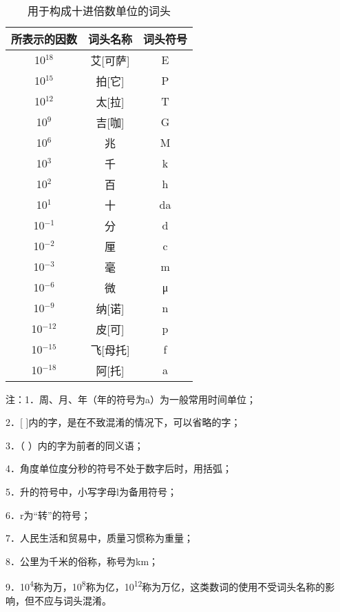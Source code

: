 \hspace*{\fill} \\


\begin{table}[htbp]
    \centering
    \caption{用于构成十进倍数单位的词头}
    \begin{tabular}{ccc}
        \toprule
        所表示的因数 & 词头名称 & 词头符号 \\
        \midrule
        10$^{18}$    & 艾[可萨] & E        \\
        10$^{15}$    & 拍[它]   & P        \\
        10$^{12}$    & 太[拉]   & T        \\
        10$^{9}$     & 吉[咖]   & G        \\
        10$^{6}$     & 兆       & M        \\
        10$^{3}$     & 千       & k        \\
        10$^{2}$     & 百       & h        \\
        10$^{1}$     & 十       & da       \\
        10$^{-1}$    & 分       & d        \\
        10$^{-2}$    & 厘       & c        \\
        10$^{-3}$    & 毫       & m        \\
        10$^{-6}$    & 微       & μ        \\
        10$^{-9}$    & 纳[诺]   & n        \\
        10$^{-12}$   & 皮[可]   & p        \\
        10$^{-15}$   & 飞[母托] & f        \\
        10$^{-18}$   & 阿[托]   & a        \\
        \bottomrule
    \end{tabular}%
    \label{tab:addlabel}%
\end{table}%

\parbox[t]{\textwidth}{
注：1．周、月、年（年的符号为a）为一般常用时间单位；

\hspace{2em}2．{[} {]}内的字，是在不致混淆的情况下，可以省略的字；

\hspace{2em}3．（ ）内的字为前者的同义语；

\hspace{2em}4．角度单位度分秒的符号不处于数字后时，用括弧；

\hspace{2em}5．升的符号中，小写字母l为备用符号；

\hspace{2em}6．r为``转''的符号；

\hspace{2em}7．人民生活和贸易中，质量习惯称为重量；

\hspace{2em}8．公里为千米的俗称，称号为km；

\hspace{2em}9．10\textsuperscript{4}称为万，10\textsuperscript{8}称为亿，10\textsuperscript{12}称为万亿，这类数词的使用不受词头名称的影响，但不应与词头混淆。
}

